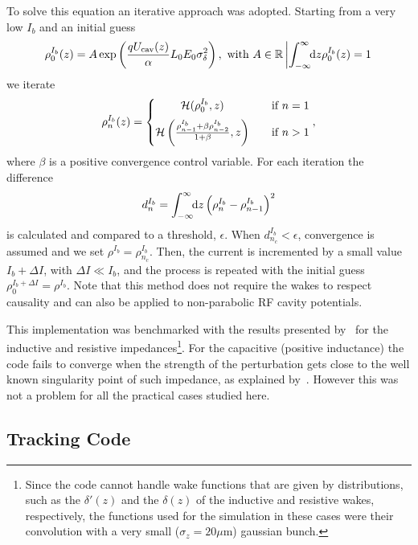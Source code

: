 \begin{apendicesenv}
    To solve this equation an iterative approach was adopted. Starting from a very low $I_b$ and an initial guess
    \begin{align}
        \rho_0^{I_b}(z) = A\exp\left(\frac{qU_\text{cav}(z)}\alpha L_0 E_0 \sigma_\delta^2\right), \,\,
        \text{with}\,\, A \in \mathbb{R} \left| \int_{-\infty}^{\infty}\!\!\text{d}z \rho_0^{I_b}(z)=1\right.
    \end{align}
    we iterate
    \begin{align}
        \rho_n^{I_b}(z) = \left\{
        \begin{matrix}
            \mathcal{H}(\rho_0^{I_b},z)       & \quad \text{if } n = 1\\[2mm]
            \mathcal{H}\left(\frac{\rho_{n-1}^{I_b} + \beta\rho_{n-2}^{I_b}}{1+\beta},z\right) & \quad \text{if } n > 1
        \end{matrix}\right.,
    \end{align}
    where $\beta$ is a positive convergence control variable. For each iteration the difference
    \begin{align}
        d_n^{I_b} = \int_{-\infty}^{\infty}\!\!\text{d}z \left(\rho_n^{I_b}-\rho_{n-1}^{I_b}\right)^2
    \end{align}
    is calculated and compared to a threshold, $\epsilon$. When $d_{n_c}^{I_b}<\epsilon$, convergence is assumed and we set $\rho^{I_b} = \rho_{n_c}^{I_b}$. Then, the current is incremented by a small value $I_b + \Delta I$, with $\Delta I \ll I_b$, and the process is repeated with the initial guess $\rho_0^{I_b+\Delta I} = \rho^{I_b}$. Note that this method does not require the wakes to respect causality and can also be applied to non-parabolic RF cavity potentials.

    This implementation was benchmarked with the results presented by~ for the inductive and resistive impedances\footnote{Since the code cannot handle wake functions that are given by distributions, such as the $\delta'(z)$ and the $\delta(z)$ of the inductive and resistive wakes, respectively, the functions used for the simulation in these cases were their convolution with a very small ($\sigma_z=20\mu$m) gaussian bunch.}. For the capacitive (positive inductance) the code fails to converge when the strength of the perturbation gets close to the well known singularity point of such impedance, as explained by~. However this was not a problem for all the practical cases studied here.

\subsection{Tracking Code}


\end{apendicesenv}
